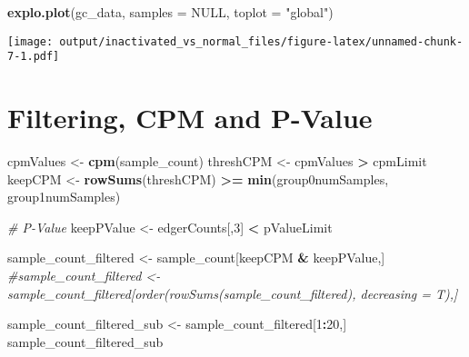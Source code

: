 \documentclass[]{article}
\newenvironment{Shaded}{\begin{snugshade}}{\end{snugshade}}
\newcommand{\KeywordTok}[1]{\textcolor[rgb]{0.13,0.29,0.53}{\textbf{#1}}}
\newcommand{\DataTypeTok}[1]{\textcolor[rgb]{0.13,0.29,0.53}{#1}}
\newcommand{\DecValTok}[1]{\textcolor[rgb]{0.00,0.00,0.81}{#1}}
\newcommand{\StringTok}[1]{\textcolor[rgb]{0.31,0.60,0.02}{#1}}
\newcommand{\CommentTok}[1]{\textcolor[rgb]{0.56,0.35,0.01}{\textit{#1}}}
\newcommand{\OtherTok}[1]{\textcolor[rgb]{0.56,0.35,0.01}{#1}}
\newcommand{\OperatorTok}[1]{\textcolor[rgb]{0.81,0.36,0.00}{\textbf{#1}}}
\newcommand{\NormalTok}[1]{#1}
\begin{document}
\begin{Shaded}
\begin{Highlighting}[]
\KeywordTok{explo.plot}\NormalTok{(gc_data, }\DataTypeTok{samples =} \OtherTok{NULL}\NormalTok{, }\DataTypeTok{toplot =} \StringTok{"global"}\NormalTok{)}
\end{Highlighting}
\end{Shaded}

\texttt{[image: output/inactivated\_vs\_normal\_files/figure-latex/unnamed-chunk-7-1.pdf]}

\section{Filtering, CPM and P-Value}\label{filtering-cpm-and-p-value}

\begin{Shaded}
\begin{Highlighting}[]
\NormalTok{cpmValues <-}\StringTok{ }\KeywordTok{cpm}\NormalTok{(sample_count)}
\NormalTok{threshCPM <-}\StringTok{ }\NormalTok{cpmValues }\OperatorTok{>}\StringTok{ }\NormalTok{cpmLimit}
\NormalTok{keepCPM <-}\StringTok{ }\KeywordTok{rowSums}\NormalTok{(threshCPM) }\OperatorTok{>=}\StringTok{ }\KeywordTok{min}\NormalTok{(group0numSamples, group1numSamples)}

\CommentTok{# P-Value}
\NormalTok{keepPValue <-}\StringTok{ }\NormalTok{edgerCounts[,}\DecValTok{3}\NormalTok{] }\OperatorTok{<}\StringTok{ }\NormalTok{pValueLimit}

\NormalTok{sample_count_filtered <-}\StringTok{ }\NormalTok{sample_count[keepCPM }\OperatorTok{&}\StringTok{ }\NormalTok{keepPValue,]}
\CommentTok{#sample_count_filtered <- sample_count_filtered[order(rowSums(sample_count_filtered), decreasing = T),]}

\NormalTok{sample_count_filtered_sub <-}\StringTok{ }\NormalTok{sample_count_filtered[}\DecValTok{1}\OperatorTok{:}\DecValTok{20}\NormalTok{,]}
\NormalTok{sample_count_filtered_sub}
\end{Highlighting}
\end{Shaded}
\end{document}
